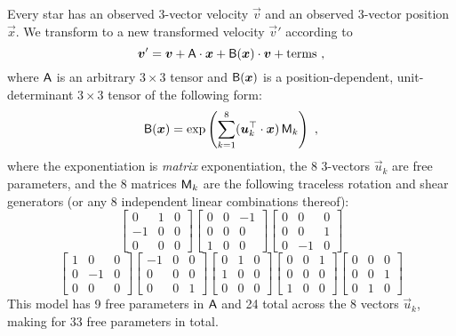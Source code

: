 \documentclass[modern]{aastex62}
\begin{document}
Every star has an observed 3-vector velocity $\vec{v}$ and an observed
3-vector position $\vec{x}$.
We transform to a new transformed velocity $\vec{v}'$ according to
\begin{equation}
  \vec{v}' = \vec{v} + \mat{A}\cdot\vec{x} + \mat{B}(\vec{x})\cdot\vec{v} + \mbox{terms}
  ~,
\end{equation}
where
$\mathsf{A}$ is an arbitrary $3\times 3$ tensor and
$\mathsf{B}(\boldsymbol{x})$ is a position-dependent, unit-determinant $3\times 3$ tensor
of the following form:
\begin{equation}
  \mat{B}(\vec{x}) = \exp\left(\sum_{k=1}^8 (\vec{u}_k^\top\cdot\vec{x})\,\mat{M}_k\right)
  ~,
\end{equation}
where
the exponentiation is \emph{matrix} exponentiation,
the 8 3-vectors $\vec{u}_k$ are free parameters,
and the 8 matrices $\mathsf{M}_k$ are the following traceless rotation and shear generators (or any 8 independent linear combinations thereof):
\begin{equation}
  \begin{bmatrix} 0 & 1 & 0 \\ -1 & 0 & 0 \\ 0 & 0 & 0 \end{bmatrix}
  \begin{bmatrix} 0 & 0 & -1 \\ 0 & 0 & 0 \\ 1 & 0 & 0 \end{bmatrix}
  \begin{bmatrix} 0 & 0 & 0 \\ 0 & 0 & 1 \\ 0 & -1 & 0 \end{bmatrix}
\end{equation}
\begin{equation}
  \begin{bmatrix} 1 & 0 & 0 \\ 0 & -1 & 0 \\ 0 & 0 & 0 \end{bmatrix}
  \begin{bmatrix} -1 & 0 & 0 \\ 0 & 0 & 0 \\ 0 & 0 & 1 \end{bmatrix}
  \begin{bmatrix} 0 & 1 & 0 \\ 1 & 0 & 0 \\ 0 & 0 & 0 \end{bmatrix}
  \begin{bmatrix} 0 & 0 & 1 \\ 0 & 0 & 0 \\ 1 & 0 & 0 \end{bmatrix}
  \begin{bmatrix} 0 & 0 & 0 \\ 0 & 0 & 1 \\ 0 & 1 & 0 \end{bmatrix}
\end{equation}
This model has 9 free parameters in $\mathsf{A}$ and 24 total across
the 8 vectors $\vec{u}_k$, making for 33 free parameters in total.
\end{document}
